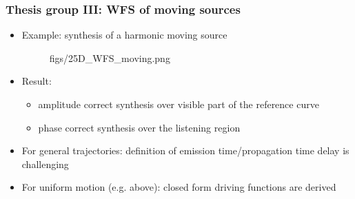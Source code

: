 \documentclass{beamer}
\begin{document}
\begin{frame}
\frametitle{Thesis group III: WFS of moving sources}
\begin{itemize}
\item Example: synthesis of a harmonic moving source
\begin{figure}  
\hspace{-10mm}
	\begin{overpic}[width = 0.95\columnwidth ]{figs/25D_WFS_moving.png}
	\end{overpic}  
\end{figure}
\item Result:
\begin{itemize}
\small
	\item amplitude correct synthesis over visible part of the reference curve
	\item phase correct synthesis over the listening region
\end{itemize}
\item For general trajectories: definition of emission time/propagation time delay is challenging
\end{itemize}
\vspace{-1mm}
\begin{tcolorbox}
\begin{itemize}
\item For uniform motion (e.g. above): closed form driving functions are derived
\end{itemize}
\end{tcolorbox}
\end{frame}
\end{document}

